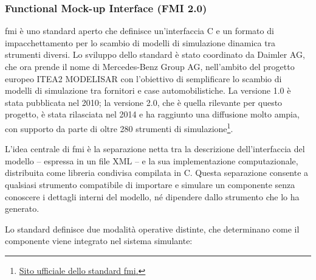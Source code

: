\subsubsection{Functional Mock-up Interface (FMI 2.0)}
\label{subsec:background-fmi-standard}

\ac{fmi} è uno standard aperto che definisce un'interfaccia C e un formato di impacchettamento per lo scambio di modelli di simulazione dinamica tra strumenti diversi. Lo sviluppo dello standard è stato coordinato da Daimler AG, che ora prende il nome di Mercedes-Benz Group AG, nell'ambito del progetto europeo ITEA2 MODELISAR con l'obiettivo di semplificare lo scambio di modelli di simulazione tra fornitori e case automobilistiche. La versione 1.0 è stata pubblicata nel 2010; la versione 2.0, che è quella rilevante per questo progetto, è stata rilasciata nel 2014 e ha raggiunto una diffusione molto ampia, con supporto da parte di oltre 280 strumenti di simulazione\footnote{\href{https://fmi-standard.org}{Sito ufficiale dello standard \ac{fmi}.}}.

L'idea centrale di \ac{fmi} è la separazione netta tra la descrizione dell'interfac\-cia del modello -- espressa in un file XML -- e la sua implementazione computazionale, distribuita come libreria condivisa compilata in C. Questa separazione consente a qualsiasi strumento compatibile di importare e simulare un componente senza conoscere i dettagli interni del modello, né dipendere dallo strumento che lo ha generato.

Lo standard definisce due modalità operative distinte, che determinano come il componente viene integrato nel sistema simulante:

